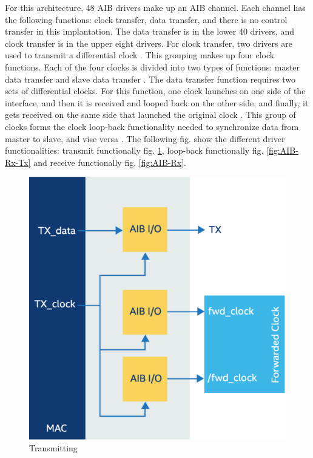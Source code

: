 \documentclass[../main.tex]{subfiles}
\begin{document}
 For this architecture, 48 AIB drivers make up an AIB channel. Each channel has the following functions: clock transfer, data transfer, and there is no control transfer in this implantation. The data transfer is in the lower 40 drivers, and clock transfer is in the upper eight drivers. For clock transfer, two drivers are used to transmit a differential clock \cite{AIBWhitePaper}. This grouping makes up four clock functions. Each of the four clocks is divided into two types of functions: master data transfer and slave data transfer \cite{AIBWhitePaper}. The data transfer function requires two sets of differential clocks. For this function, one clock launches on one side of the interface, and then it is received and looped back on the other side, and finally, it gets received on the same side that launched the original clock \cite{AIBWhitePaper}. This group of clocks forms the clock loop-back functionality needed to synchronize data from master to slave, and vise versa \cite{AIBWhitePaper}. The following fig. show the different driver functionalities: transmit functionally fig. \ref{fig:AIB-Tx}, loop-back functionally fig. \ref{fig:AIB-Rx-Tx} and receive functionally fig. \ref{fig:AIB-Rx}. 

\begin{figure}
    \centering
    \includegraphics[scale=.16]{pngs/AIB-Tx.png}
    \caption{Transmitting\cite{AIBWhitePaper}}
    \label{fig:AIB-Tx}
\end{figure}
\end{document}
